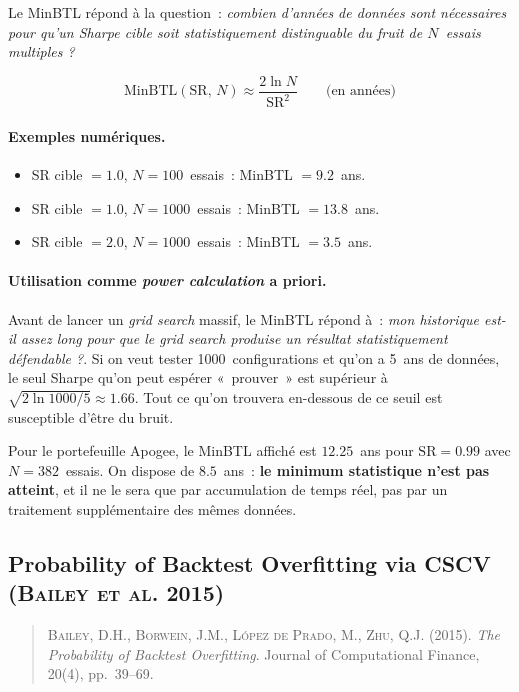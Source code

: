 Le MinBTL répond à la question~: \emph{combien d'années de données sont nécessaires pour qu'un Sharpe cible soit statistiquement distinguable du fruit de $N$~essais multiples ?}

\begin{equation}
\mathrm{MinBTL}(\mathrm{SR},\, N) \approx \frac{2 \ln N}{\mathrm{SR}^{2}}
\qquad\text{(en années)}
\label{eq:minbtl}
\end{equation}

\paragraph{Exemples numériques.}
\begin{itemize}
\item SR cible $= 1.0$, $N = 100$~essais~: MinBTL $= 9.2$~ans.
\item SR cible $= 1.0$, $N = 1000$~essais~: MinBTL $= 13.8$~ans.
\item SR cible $= 2.0$, $N = 1000$~essais~: MinBTL $= 3.5$~ans.
\end{itemize}

\paragraph{Utilisation comme \emph{power calculation} a priori.} Avant de lancer un \emph{grid search} massif, le MinBTL répond à~: \emph{mon historique est-il assez long pour que le grid search produise un résultat statistiquement défendable ?}. Si on veut tester 1000~configurations et qu'on a 5~ans de données, le seul Sharpe qu'on peut espérer «~prouver~» est supérieur à $\sqrt{2 \ln 1000 / 5} \approx 1.66$. Tout ce qu'on trouvera en-dessous de ce seuil est susceptible d'être du bruit.

Pour le portefeuille Apogee, le MinBTL affiché est $12.25$~ans pour $\mathrm{SR} = 0.99$ avec $N = 382$~essais. On dispose de $8.5$~ans~: \textbf{le minimum statistique n'est pas atteint}, et il ne le sera que par accumulation de temps réel, pas par un traitement supplémentaire des mêmes données.

\subsection{Probability of Backtest Overfitting via CSCV (\textsc{Bailey et al.} 2015)}
\label{app:pbo_cscv}

\begin{quote}\small
\textsc{Bailey}, D.H., \textsc{Borwein}, J.M., \textsc{L\'opez de Prado}, M., \textsc{Zhu}, Q.J. (2015). \emph{The Probability of Backtest Overfitting}. Journal of Computational Finance, 20(4), pp.~39--69.
\end{quote}

